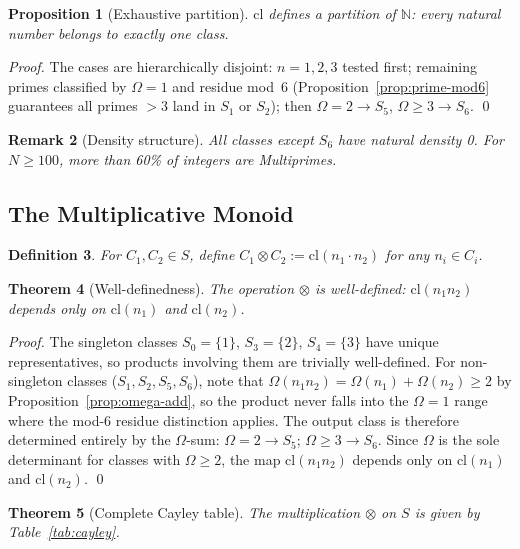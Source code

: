 \documentclass[10pt,twocolumn]{article}
\newtheorem{theorem}{Theorem}[section]
\newtheorem{proposition}[theorem]{Proposition}
\newtheorem{definition}[theorem]{Definition}
\newtheorem{remark}[theorem]{Remark}
\newcommand{\cl}{\mathrm{cl}}
\newcommand{\Om}{\Omega}
\newcommand{\N}{\mathbb{N}}
\begin{document}
\begin{proposition}[Exhaustive partition]\label{prop:partition}
$\cl$ defines a partition of $\N$: every natural number belongs to
exactly one class.
\end{proposition}
\begin{proof}
The cases are hierarchically disjoint: $n=1,2,3$ tested first; remaining
primes classified by $\Om=1$ and residue mod~6 (Proposition~\ref{prop:prime-mod6}
guarantees all primes $>3$ land in $S_1$ or $S_2$); then
$\Om=2 \to S_5$, $\Om\geq 3 \to S_6$. \qed
\end{proof}

\begin{remark}[Density structure]\label{rem:density}
All classes except $S_6$ have natural density 0. For $N \geq 100$, more
than 60\% of integers are Multiprimes.
\end{remark}

\subsection{The Multiplicative Monoid}

\begin{definition}\label{def:otimes}
For $C_1, C_2 \in S$, define
$C_1 \otimes C_2 := \cl(n_1 \cdot n_2)$ for any $n_i \in C_i$.
\end{definition}

\begin{theorem}[Well-definedness]\label{thm:welldef}
The operation $\otimes$ is well-defined: $\cl(n_1 n_2)$ depends only on
$\cl(n_1)$ and $\cl(n_2)$.
\end{theorem}
\begin{proof}
The singleton classes $S_0=\{1\}$, $S_3=\{2\}$, $S_4=\{3\}$ have unique
representatives, so products involving them are trivially well-defined.
For non-singleton classes ($S_1, S_2, S_5, S_6$), note that
$\Om(n_1 n_2) = \Om(n_1) + \Om(n_2) \geq 2$ by Proposition~\ref{prop:omega-add}, so the
product never falls into the $\Om=1$ range where the mod-6 residue
distinction applies. The output class is therefore determined entirely by
the $\Om$-sum: $\Om = 2 \to S_5$; $\Om \geq 3 \to S_6$. Since $\Om$ is
the sole determinant for classes with $\Om \geq 2$, the map
$\cl(n_1 n_2)$ depends only on $\cl(n_1)$ and $\cl(n_2)$. \qed
\end{proof}

\begin{theorem}[Complete Cayley table]\label{thm:cayley}
The multiplication $\otimes$ on $S$ is given by Table~\ref{tab:cayley}.
\end{theorem}
\end{document}
